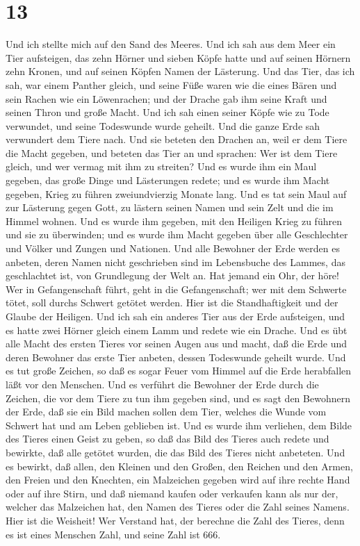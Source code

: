 \hypertarget{section-12}{%
\section{13}\label{section-12}}

 Und ich stellte mich auf den Sand des Meeres. Und ich sah
aus dem Meer ein Tier aufsteigen, das zehn Hörner und sieben Köpfe hatte
und auf seinen Hörnern zehn Kronen, und auf seinen Köpfen Namen der
Lästerung.  Und das Tier, das ich sah, war einem Panther
gleich, und seine Füße waren wie die eines Bären und sein Rachen wie ein
Löwenrachen; und der Drache gab ihm seine Kraft und seinen Thron und
große Macht.  Und ich sah einen seiner Köpfe wie zu Tode
verwundet, und seine Todeswunde wurde geheilt. Und die ganze Erde sah
verwundert dem Tiere nach.  Und sie beteten den Drachen
an, weil er dem Tiere die Macht gegeben, und beteten das Tier an und
sprachen: Wer ist dem Tiere gleich, und wer vermag mit ihm zu streiten?
 Und es wurde ihm ein Maul gegeben, das große Dinge und
Lästerungen redete; und es wurde ihm Macht gegeben, Krieg zu führen
zweiundvierzig Monate lang.  Und es tat sein Maul auf zur
Lästerung gegen Gott, zu lästern seinen Namen und sein Zelt und die im
Himmel wohnen.  Und es wurde ihm gegeben, mit den Heiligen
Krieg zu führen und sie zu überwinden; und es wurde ihm Macht gegeben
über alle Geschlechter und Völker und Zungen und Nationen.
 Und alle Bewohner der Erde werden es anbeten, deren Namen
nicht geschrieben sind im Lebensbuche des Lammes, das geschlachtet ist,
von Grundlegung der Welt an.  Hat jemand ein Ohr, der
höre!  Wer in Gefangenschaft führt, geht in die
Gefangenschaft; wer mit dem Schwerte tötet, soll durchs Schwert getötet
werden. Hier ist die Standhaftigkeit und der Glaube der Heiligen.
 Und ich sah ein anderes Tier aus der Erde aufsteigen,
und es hatte zwei Hörner gleich einem Lamm und redete wie ein Drache.
 Und es übt alle Macht des ersten Tieres vor seinen Augen
aus und macht, daß die Erde und deren Bewohner das erste Tier anbeten,
dessen Todeswunde geheilt wurde.  Und es tut große
Zeichen, so daß es sogar Feuer vom Himmel auf die Erde herabfallen läßt
vor den Menschen.  Und es verführt die Bewohner der Erde
durch die Zeichen, die vor dem Tiere zu tun ihm gegeben sind, und es
sagt den Bewohnern der Erde, daß sie ein Bild machen sollen dem Tier,
welches die Wunde vom Schwert hat und am Leben geblieben ist.
 Und es wurde ihm verliehen, dem Bilde des Tieres einen
Geist zu geben, so daß das Bild des Tieres auch redete und bewirkte, daß
alle getötet wurden, die das Bild des Tieres nicht anbeteten.
 Und es bewirkt, daß allen, den Kleinen und den Großen,
den Reichen und den Armen, den Freien und den Knechten, ein Malzeichen
gegeben wird auf ihre rechte Hand oder auf ihre Stirn, 
und daß niemand kaufen oder verkaufen kann als nur der, welcher das
Malzeichen hat, den Namen des Tieres oder die Zahl seines Namens.
 Hier ist die Weisheit! Wer Verstand hat, der berechne
die Zahl des Tieres, denn es ist eines Menschen Zahl, und seine Zahl ist
666.

